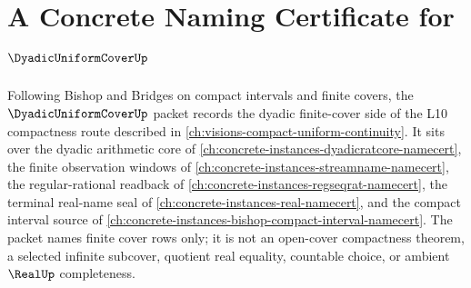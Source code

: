 \chapter{A Concrete Naming Certificate for $\DyadicUniformCoverUp$}
\label{ch:concrete-instances-dyadic-uniform-cover-namecert}

Following Bishop and Bridges on compact intervals and finite covers, the $\DyadicUniformCoverUp$ packet records the dyadic finite-cover side of the L10 compactness route described in \autoref{ch:visions-compact-uniform-continuity}. It sits over the dyadic arithmetic core of \autoref{ch:concrete-instances-dyadicratcore-namecert}, the finite observation windows of \autoref{ch:concrete-instances-streamname-namecert}, the regular-rational readback of \autoref{ch:concrete-instances-regseqrat-namecert}, the terminal real-name seal of \autoref{ch:concrete-instances-real-namecert}, and the compact interval source of \autoref{ch:concrete-instances-bishop-compact-interval-namecert}. The packet names finite cover rows only; it is not an open-cover compactness theorem, a selected infinite subcover, quotient real equality, countable choice, or ambient $\RealUp$ completeness.

